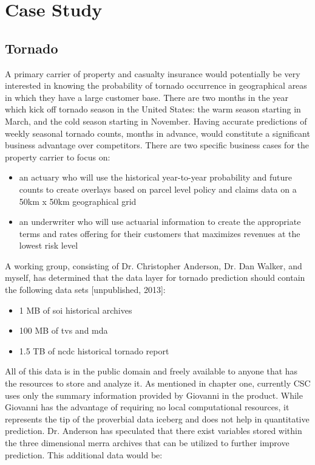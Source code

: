 

\chapter{Case Study}
\section*{Tornado}
A primary carrier of property and casualty insurance would potentially be very interested in knowing the probability of tornado occurrence in geographical areas in which they have a large customer base. There are two months in the year which kick off tornado season in the United States: the warm season starting in March, and the cold season starting in November. Having accurate predictions of weekly seasonal tornado counts, months in advance, would constitute a significant business advantage over competitors. There are two specific business cases for the property carrier to focus on:
\begin{itemize}
    \item an actuary who will use the historical year-to-year probability and future counts to create overlays based on parcel level policy and claims data on a 50km x 50km geographical grid
    \item an underwriter who will use actuarial information to create the appropriate terms and rates offering for their customers that maximizes revenues at the lowest risk level
\end{itemize}
A working group, consisting of Dr. Christopher Anderson, Dr. Dan Walker, and myself, has determined that the data layer for tornado prediction should contain the following data sets [unpublished, 2013]:
\begin{itemize}
    \item 1 MB of \gls{soi} historical archives \cite{bom}
    \item 100 MB of \gls{tvs} and \gls{mda} \cite{hdss}
    \item 1.5 TB of \gls{ncdc} historical tornado report \cite{ncdc}
\end{itemize}
All of this data is in the public domain and freely available to anyone that has the resources to store and analyze it. As mentioned in chapter one, currently CSC uses only the summary information provided by Giovanni in the \climatedge product. While Giovanni has the advantage of requiring no local computational resources, it represents the tip of the proverbial data iceberg and does not help in quantitative prediction. Dr. Anderson has speculated that there exist variables stored within the three dimensional \gls{merra} archives that can be utilized to further improve prediction. This additional data would be:
